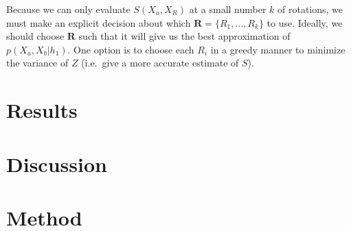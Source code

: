 \documentclass{article} %
\begin{document}
Because we can only evaluate $S(X_a, X_R)$ at a small number $k$ of
rotations, we must make an explicit decision about which
$\mathbf{R}=\{R_1, \ldots{}, R_k\}$ to use. Ideally, we should choose
$\mathbf{R}$ such that it will give us the best approximation of
$p(X_a, X_b\vert h_1)$. One option is to choose each $R_i$ in a greedy
manner to minimize the variance of $Z$ (i.e.~give a more accurate
estimate of $S$).

\section{Results}

\section{Discussion}

\section{Method}


\renewcommand\refname{\normalsize{References}}


\end{document}
